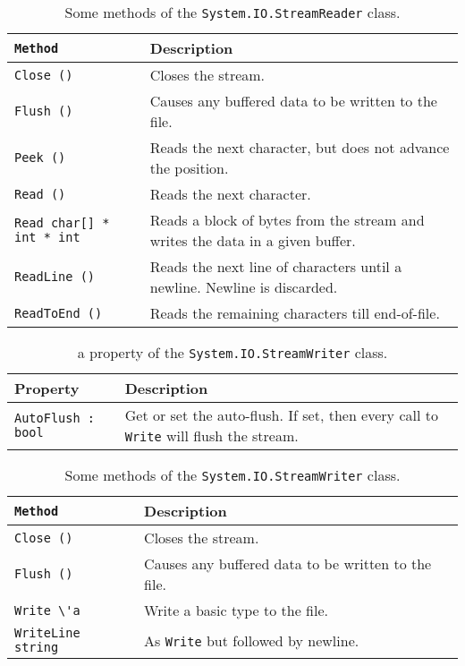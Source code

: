 \begin{table}
  \centering
  \begin{tabularx}{\linewidth}{|l|X|}
    \hline
    \lstinline{Method} & Description\\
    \hline
    \lstinline{Close ()} & Closes the stream.\\
    \hline
    \lstinline{Flush ()} & Causes any buffered data to be written to the file.\\
    \hline
    \lstinline{Peek ()} & Reads the next character, but does not advance the position.\\
    \hline
    \lstinline{Read ()} & Reads the next character.\\
    \hline
    \lstinline{Read char[] * int * int} & Reads a block of bytes from the stream and writes the data in a given buffer.\\
    \hline
    \lstinline{ReadLine ()} & Reads the next line of characters until a newline. Newline is discarded.\\
    \hline
    \lstinline{ReadToEnd ()} & Reads the remaining characters till end-of-file.\\
    \hline
  \end{tabularx}
  \caption{Some methods of the \lstinline!System.IO.StreamReader! class.}
  \label{tab:streamReaderMethods}
\end{table}
\begin{table}
  \centering
  \begin{tabularx}{\linewidth}{|l|X|}
    \hline
    Property & Description\\
    \hline
    \lstinline{AutoFlush : bool} & Get or set the auto-flush. If set, then every call to \lstinline!Write! will flush the stream.\\
    \hline
  \end{tabularx}
  \caption{a property of the \lstinline!System.IO.StreamWriter! class.}
  \label{tab:streamWriterProperties}
\end{table}
\begin{table}
  \centering
  \begin{tabularx}{\linewidth}{|l|X|}
    \hline
    \lstinline{Method} & Description\\
    \hline
    \lstinline{Close ()} & Closes the stream.\\
    \hline
    \lstinline{Flush ()} & Causes any buffered data to be written to the file.\\
    \hline
    \lstinline{Write \'a} & Write a basic type to the file.\\
    \hline
    \lstinline{WriteLine string} & As \lstinline!Write! but followed by newline.\\
    \hline
  \end{tabularx}
  \caption{Some methods of the \lstinline!System.IO.StreamWriter! class.}
  \label{tab:streamWriterMethods}
\end{table}

